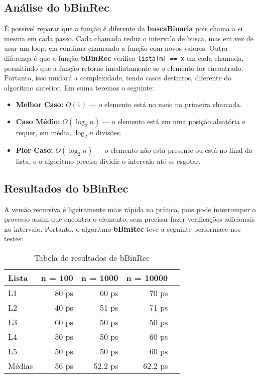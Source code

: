 \subsection{Análise do bBinRec}

É possível reparar que a função é diferente da \textbf{buscaBinaria} pois chama a si mesma em cada passo. Cada chamada reduz o intervalo de busca, mas em vez de usar um loop, ela continua chamando a função com novos valores. Outra diferença é que a função \textbf{bBinRec} verifica \texttt{lista[m] == x} em cada chamada, permitindo que a função retorne imediatamente se o elemento for encontrado. Portanto, isso mudará a complexidade, tendo casos destintos, diferente do algoritmo anterior.
Em suma teremos o seguinte:

\begin{itemize}
	\item \textbf{Melhor Caso:} $O(1)$ — o elemento está no meio na primeira chamada.
	\item \textbf{Caso Médio:} $O(\log_2 n)$ — o elemento está em uma posição aleatória e requer, em média, $\log_2 n$ divisões.
	\item \textbf{Pior Caso:} $O(\log_2 n)$ — o elemento não está presente ou está no final da lista, e o algoritmo precisa dividir o intervalo até se esgotar.
\end{itemize}

\subsection{Resultados do bBinRec}

A versão recursiva é ligeiramente mais rápida na prática, pois pode interromper o processo assim que encontra o elemento, sem precisar fazer verificações adicionais no intervalo.
Portanto, o algoritmo \textbf{bBinRec} teve a seguinte performace nos testes:

\begin{table}[h!]
	\centering
	\caption{Tabela de resultados de bBinRec}
	\label{tab:bBin_rec_result}
	\begin{tabular}{lrrrr}
		\toprule
		Lista   & n = 100   & n = 1000  & n = 10000 \\
		\midrule
		L1      & 80 ps    & 60 ps    & 70 ps  \\
		L2      & 40 ps    & 51 ps    & 71 ps  \\
		L3      & 60 ps    & 50 ps    & 50 ps  \\
		L4      & 50 ps    & 50 ps    & 60 ps  \\
		L5      & 50 ps    & 50 ps    & 60 ps  \\
		\midrule
		Médias  & 56 ps  & 52.2 ps  & 62.2 ps \\
		\bottomrule
	\end{tabular}
\end{table}

